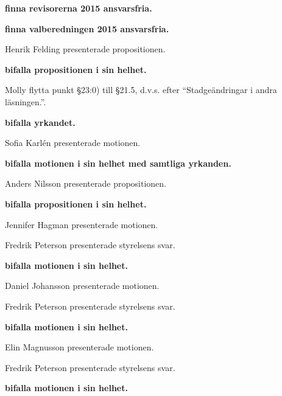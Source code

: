 \documentclass[10pt]{article}
\begin{document}
\begin{paragrafer}
\begin{paragrafer}
        \textbf{\Mba finna revisorerna 2015 ansvarsfria.}

        \textbf{\Mba finna valberedningen 2015 ansvarsfria.}

    \end{paragrafer}
  \begin{paragrafer}
        Henrik Felding presenterade propositionen.

        \textbf{\Mba bifalla propositionen i sin helhet.}

        Molly \ypa flytta punkt \S23:0) till \S21.5, d.v.s. efter ``Stadgeändringar i andra läsningen.''.

        \textbf{\Mba bifalla yrkandet.}


    Sofia Karlén presenterade motionen.

    \textbf{\Mba bifalla motionen i sin helhet med samtliga yrkanden.}

\end{paragrafer}
    Anders Nilsson presenterade propositionen.

    \textbf{\Mba bifalla propositionen i sin helhet.}

    \begin{paragrafer}
      Jennifer Hagman presenterade motionen.

      Fredrik Peterson presenterade styrelsens svar.

      \textbf{\Mba bifalla motionen i sin helhet.}


      Daniel Johansson presenterade motionen.

      Fredrik Peterson presenterade styrelsens svar.

      \textbf{\Mba bifalla motionen i sin helhet.}

      Elin Magnusson presenterade motionen.

      Fredrik Peterson presenterade styrelsens svar.

      \textbf{\Mba bifalla motionen i sin helhet.}


\end{paragrafer}
\end{paragrafer}
\end{document}
